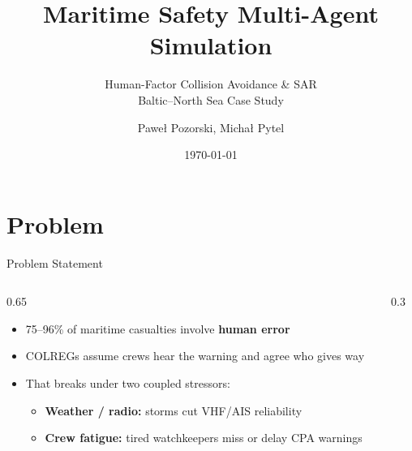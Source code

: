 \documentclass[aspectratio=169]{beamer}
\title{Maritime Safety Multi-Agent Simulation}
\subtitle{Human-Factor Collision Avoidance \& SAR\\Baltic--North Sea Case Study}
\author{Pawe\l{} Pozorski, Micha\l{} Pytel}
\institute{Warsaw University of Technology}
\date{\today}
\begin{document}
\begin{frame}[plain]
    \titlepage
\end{frame}

\section{Problem}

\begin{frame}{Problem Statement}
    \begin{columns}[c]
        \begin{column}{0.65\textwidth}
            \begin{itemize}
                \item 75--96\% of maritime casualties involve \textbf{human error}
                \item COLREGs assume crews hear the warning and agree who gives way
                \item That breaks under two coupled stressors:
                \begin{itemize}
                    \item \textbf{Weather / radio:} storms cut VHF/AIS reliability
                    \item \textbf{Crew fatigue:} tired watchkeepers miss or delay CPA warnings
                \end{itemize}
            \end{itemize}
        \end{column}
        \begin{column}{0.3\textwidth}
            \centering
        \end{column}
    \end{columns}
\end{frame}
\end{document}
